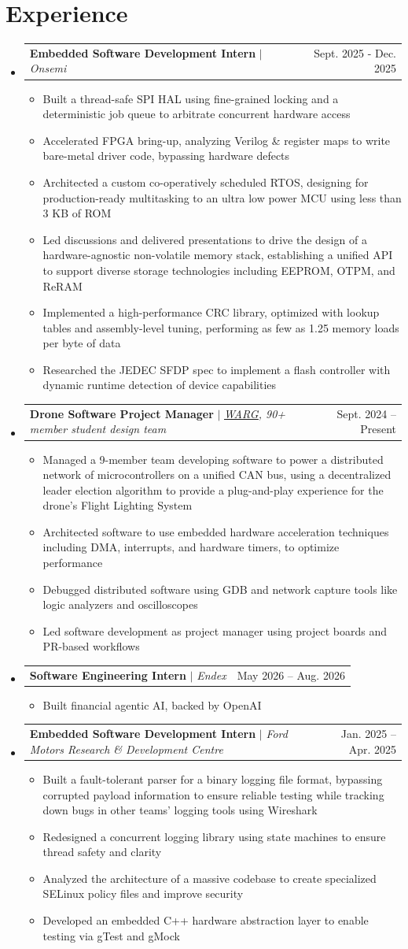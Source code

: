 \documentclass[letterpaper,9.5pt]{article}
\makeatletter
\newcommand{\resumeItem}[1]{
  \item\small{
    {#1 \vspace{-2pt}}
  }
}
\newcommand{\resumeProjectHeading}[2]{
    \item
    \begin{tabular*}{0.97\textwidth}{l@{\extracolsep{\fill}}r}
      \small#1 & #2 \\
    \end{tabular*}\vspace{-7pt}
}
\newcommand{\resumeSubHeadingListStart}{\begin{itemize}[leftmargin=0.15in, label={}]}
\newcommand{\resumeSubHeadingListEnd}{\end{itemize}}
\newcommand{\resumeItemListStart}{\begin{itemize}}
\newcommand{\resumeItemListEnd}{\end{itemize}\vspace{-5pt}}
\makeatother
\begin{document}
\section{Experience}
  \resumeSubHeadingListStart
    \resumeProjectHeading
      {\textbf{Embedded Software Development Intern} $|$ \emph{Onsemi}}{Sept. 2025 - Dec. 2025}
      \resumeItemListStart
        \resumeItem{Built a thread-safe SPI HAL using fine-grained locking and a deterministic job queue to arbitrate concurrent hardware access}
        \resumeItem{Accelerated FPGA bring-up, analyzing Verilog \& register maps to write bare-metal driver code, bypassing hardware defects}
        \resumeItem{Architected a custom co-operatively scheduled RTOS, designing for production-ready multitasking to an ultra low power MCU using less than 3 KB of ROM}
        \resumeItem{Led discussions and delivered presentations to drive the design of a hardware-agnostic non-volatile memory stack, establishing a unified API to support diverse storage technologies including EEPROM, OTPM, and ReRAM}
        \resumeItem{Implemented a high-performance CRC library, optimized with lookup tables and assembly-level tuning, performing as few as 1.25 memory loads per byte of data}
        \resumeItem{Researched the JEDEC SFDP spec to implement a flash controller with dynamic runtime detection of device capabilities}
      \resumeItemListEnd
    \resumeProjectHeading
      {\textbf{Drone Software Project Manager} $|$ \emph{\href{https://www.uwarg.com/}{\underline{WARG}}, 90+ member student design team}}{Sept. 2024 -- Present}
      \resumeItemListStart
        \resumeItem{Managed a 9-member team developing software to power a distributed network of microcontrollers on a unified CAN bus, using a decentralized leader election algorithm to provide a plug-and-play experience for the drone’s Flight Lighting System}
        \resumeItem{Architected software to use embedded hardware acceleration techniques including DMA, interrupts, and hardware timers, to optimize performance}
        \resumeItem{Debugged distributed software using GDB and network capture tools like logic analyzers and oscilloscopes}
        \resumeItem{Led software development as project manager using project boards and PR-based workflows}
      \resumeItemListEnd
    \resumeProjectHeading
      {\textbf{Software Engineering Intern} $|$ \emph{Endex}}{May 2026 -- Aug. 2026}
      \resumeItemListStart
        \resumeItem{Built financial agentic AI, backed by OpenAI}
      \resumeItemListEnd
    \resumeProjectHeading
      {\textbf{Embedded Software Development Intern} $|$ \emph{Ford Motors Research \& Development Centre}}{Jan. 2025 -- Apr. 2025}
      \resumeItemListStart
        \resumeItem{Built a fault-tolerant parser for a binary logging file format, bypassing corrupted payload information to ensure reliable testing while tracking down bugs in other teams' logging tools using Wireshark}
        \resumeItem{Redesigned a concurrent logging library using state machines to ensure thread safety and clarity}
        \resumeItem{Analyzed the architecture of a massive codebase to create specialized SELinux policy files and improve security}
        \resumeItem{Developed an embedded C++ hardware abstraction layer to enable testing via gTest and gMock}
    \resumeItemListEnd
  \resumeSubHeadingListEnd
\end{document}
